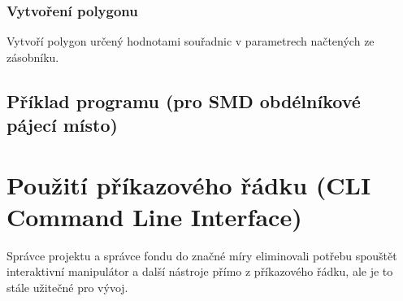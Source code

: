 \documentclass[letterpaper,10pt,czech]{sphinxmanual}
\begin{document}
\subsection{Vytvoření polygonu}
\label{\detokenize{parameter-programs:vytvoreni-polygonu}}
Vytvoří polygon určený hodnotami souřadnic v parametrech načtených ze zásobníku.


\section{Příklad programu (pro SMD obdélníkové pájecí místo)}
\label{\detokenize{parameter-programs:priklad-programu-pro-smd-obdelnikove-pajeci-misto}}
\begin{sphinxVerbatim}[commandchars=\\\{\}]
 \PYG{p}{[}  \PYG{p}{]}
 \PYG{p}{[}  \PYG{p}{]}
 
 \PYG{p}{[}   \PYG{p}{]}
 \PYG{p}{[}  \PYG{p}{]}
 
 \PYG{p}{[}   \PYG{p}{]}

 \PYG{p}{[}  \PYG{p}{]}
 
 \PYG{p}{[}   \PYG{p}{]}
\end{sphinxVerbatim}


\chapter{Použití příkazového řádku (CLI Command Line Interface)}
\label{\detokenize{cli-usage:pouziti-prikazoveho-radku-cli-command-line-interface}}\label{\detokenize{cli-usage::doc}}
Správce projektu a správce fondu do značné míry eliminovali potřebu
spouštět interaktivní manipulátor a další nástroje přímo z příkazového řádku,
ale je to stále užitečné pro vývoj.
\end{document}
